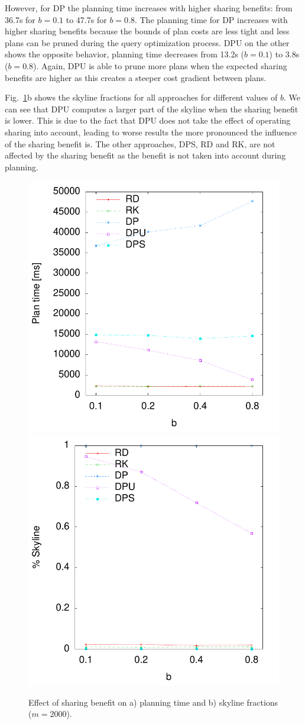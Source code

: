 However, for DP the planning time increases with higher sharing
benefits: from 36.7s for $b=0.1$ to 47.7s for $b=0.8$.  The planning
time for DP increases with higher sharing benefits because the bounds
of plan costs are less tight and less plans can be pruned during the
query optimization process. DPU on the other shows the opposite
behavior, planning time decreases from 13.2s ($b=0.1$) to 3.8s
($b=0.8$). Again, DPU is able to prune more plans when the expected
sharing benefits are higher as this creates a steeper cost gradient
between plans.

Fig.~\ref{fig:pareto_sharing}b shows the skyline fractions for all
approaches for different values of $b$. We can see that DPU computes a
larger part of the skyline when the sharing benefit is lower. This is
due to the fact that DPU does not take the effect of operating sharing
into account, leading to worse results the more pronounced the
influence of the sharing benefit is. The other approaches, DPS, RD and
RK, are not affected by the sharing benefit as the benefit is not
taken into account during planning.

\begin{figure}[htb]
  \centering
  \includegraphics[width=0.49\linewidth]{figs/pareto_plan_b.pdf}
  \includegraphics[width=0.49\linewidth]{figs/plans_skyline_by_b.pdf}
  \caption{Effect of sharing benefit on a) planning time and b)
    skyline fractions ($m=2000$).}
  \label{fig:pareto_sharing}
\end{figure}

